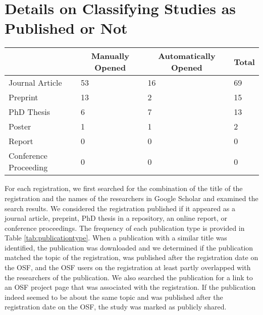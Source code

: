 \documentclass[
  ,jou, a4paper,floatsintext]{apa6}
\begin{document}
\hypertarget{details-on-classifying-studies-as-published-or-not}{%
\section{Details on Classifying Studies as Published or Not}\label{details-on-classifying-studies-as-published-or-not}}

\begin{table*}[tbp]

\begin{center}
\begin{threeparttable}

\caption{\label{tab:publicationtype}Type of document that matched the registration for all registrations that were publicly shared}

\begin{tabular}{llll}
\toprule
 & \multicolumn{1}{c}{Manually Opened} & \multicolumn{1}{c}{Automatically Opened} & \multicolumn{1}{c}{Total}\\
\midrule
Journal Article & 53 & 16 & 69\\
Preprint & 13 & 2 & 15\\
PhD Thesis & 6 & 7 & 13\\
Poster & 1 & 1 & 2\\
Report & 0 & 0 & 0\\
Conference Proceeding & 0 & 0 & 0\\
\bottomrule
\end{tabular}

\end{threeparttable}
\end{center}

\end{table*}

For each registration, we first searched for the combination of the title of the registration and the names of the researchers in Google Scholar and examined the search results. We considered the registration published if it appeared as a journal article, preprint, PhD thesis in a repository, an online report, or conference proceedings. The frequency of each publication type is provided in Table \ref{tab:publicationtype}. When a publication with a similar title was identified, the publication was downloaded and we determined if the publication matched the topic of the registration, was published after the registration date on the OSF, and the OSF users on the registration at least partly overlapped with the researchers of the publication. We also searched the publication for a link to an OSF project page that was associated with the registration. If the publication indeed seemed to be about the same topic and was published after the registration date on the OSF, the study was marked as publicly shared.
\end{document}
